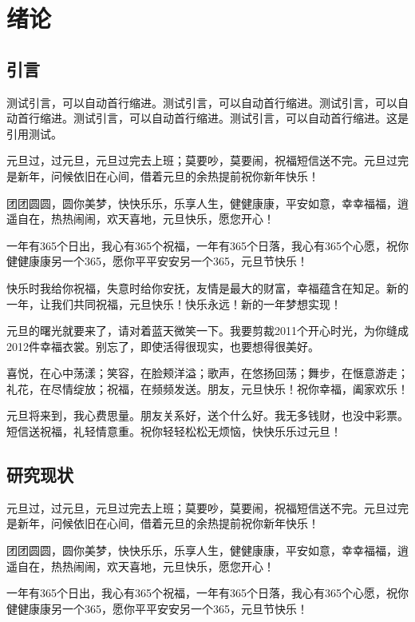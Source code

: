 
\chapter{绪论}

\section{引言}

测试引言，可以自动首行缩进。测试引言，可以自动首行缩进。测试引言，可以自动首行缩进。测试引言，可以自动首行缩进。测试引言，可以自动首行缩进。这是引用测试\cite{barnes2009patchmatch}。

元旦过，过元旦，元旦过完去上班；莫要吵，莫要闹，祝福短信送不完。元旦过完是新年，问候依旧在心间，借着元旦的余热提前祝你新年快乐！

团团圆圆，圆你美梦，快快乐乐，乐享人生，健健康康，平安如意，幸幸福福，逍遥自在，热热闹闹，欢天喜地，元旦快乐，愿您开心！

一年有365个日出，我心有365个祝福，一年有365个日落，我心有365个心愿，祝你健健康康另一个365，愿你平平安安另一个365，元旦节快乐！

快乐时我给你祝福，失意时给你安抚，友情是最大的财富，幸福蕴含在知足。新的一年，让我们共同祝福，元旦快乐！快乐永远！新的一年梦想实现！

元旦的曙光就要来了，请对着蓝天微笑一下。我要剪裁2011个开心时光，为你缝成2012件幸福衣裳。别忘了，即使活得很现实，也要想得很美好。

喜悦，在心中荡漾；笑容，在脸颊洋溢；歌声，在悠扬回荡；舞步，在惬意游走；礼花，在尽情绽放；祝福，在频频发送。朋友，元旦快乐！祝你幸福，阖家欢乐！

元旦将来到，我心费思量。朋友关系好，送个什么好。我无多钱财，也没中彩票。短信送祝福，礼轻情意重。祝你轻轻松松无烦恼，快快乐乐过元旦！

\section{研究现状}

元旦过，过元旦，元旦过完去上班；莫要吵，莫要闹，祝福短信送不完。元旦过完是新年，问候依旧在心间，借着元旦的余热提前祝你新年快乐！

团团圆圆，圆你美梦，快快乐乐，乐享人生，健健康康，平安如意，幸幸福福，逍遥自在，热热闹闹，欢天喜地，元旦快乐，愿您开心！

一年有365个日出，我心有365个祝福，一年有365个日落，我心有365个心愿，祝你健健康康另一个365，愿你平平安安另一个365，元旦节快乐！

